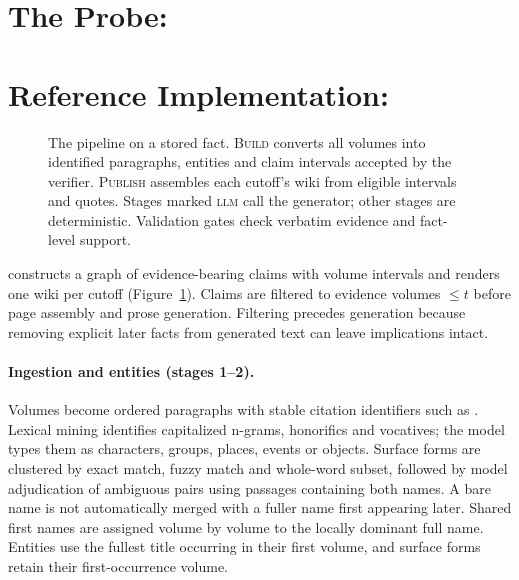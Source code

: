 \ifdefined\nwvtwo\section{The Probe: \sys}\else\section{Reference Implementation: \sys}\fi
\label{sec:method}

\begin{figure}[t]
\centering
\resizebox{\textwidth}{!}{}
\caption{The \sys pipeline on a stored fact. \textsc{Build} converts all volumes into
identified paragraphs, entities and claim intervals accepted by the verifier. \textsc{Publish} assembles
each cutoff's wiki from eligible intervals and quotes. Stages marked \textsc{llm} call the
generator; other stages are deterministic. Validation gates check verbatim evidence and
fact-level support.}
\label{fig:pipeline}
\end{figure}

\sys constructs a graph of evidence-bearing claims with volume intervals and renders one
wiki per cutoff (Figure~\ref{fig:pipeline}). Claims are filtered to evidence volumes $\le t$
before page assembly and prose generation. Filtering precedes generation because removing
explicit later facts from generated text can leave implications intact.

\paragraph{Ingestion and entities (stages 1--2).}
Volumes become ordered paragraphs with stable citation identifiers such as
. Lexical mining identifies capitalized n-grams, honorifics and vocatives;
the model types them as characters, groups, places, events or objects. Surface forms are
clustered by exact match, fuzzy match and whole-word subset, followed by model adjudication
of ambiguous pairs using passages containing both names. A bare name is not automatically
merged with a fuller name first appearing later. Shared first names are assigned
volume by volume to the locally dominant full name. Entities use the fullest title occurring
in their first volume, and surface forms retain their first-occurrence volume.

